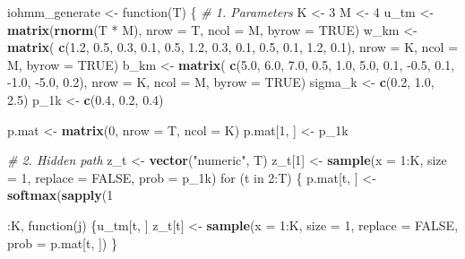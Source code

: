\documentclass[]{article}
\newenvironment{Shaded}{\begin{snugshade}}{\end{snugshade}}
\newcommand{\KeywordTok}[1]{\textcolor[rgb]{0.13,0.29,0.53}{\textbf{{#1}}}}
\newcommand{\DataTypeTok}[1]{\textcolor[rgb]{0.13,0.29,0.53}{{#1}}}
\newcommand{\DecValTok}[1]{\textcolor[rgb]{0.00,0.00,0.81}{{#1}}}
\newcommand{\FloatTok}[1]{\textcolor[rgb]{0.00,0.00,0.81}{{#1}}}
\newcommand{\StringTok}[1]{\textcolor[rgb]{0.31,0.60,0.02}{{#1}}}
\newcommand{\CommentTok}[1]{\textcolor[rgb]{0.56,0.35,0.01}{\textit{{#1}}}}
\newcommand{\OtherTok}[1]{\textcolor[rgb]{0.56,0.35,0.01}{{#1}}}
\newcommand{\NormalTok}[1]{{#1}}
\begin{document}
\begin{Shaded}
\begin{Highlighting}[]
\NormalTok{iohmm_generate <-}\StringTok{ }\NormalTok{function(T) \{}
  \CommentTok{# 1. Parameters}
  \NormalTok{K <-}\StringTok{ }\DecValTok{3}
  \NormalTok{M <-}\StringTok{ }\DecValTok{4}
  \NormalTok{u_tm <-}\StringTok{ }\KeywordTok{matrix}\NormalTok{(}\KeywordTok{rnorm}\NormalTok{(T *}\StringTok{ }\NormalTok{M), }\DataTypeTok{nrow =} \NormalTok{T, }\DataTypeTok{ncol =} \NormalTok{M, }\DataTypeTok{byrow =} \OtherTok{TRUE}\NormalTok{)}
  \NormalTok{w_km <-}\StringTok{ }\KeywordTok{matrix}\NormalTok{(}
    \KeywordTok{c}\NormalTok{(}\FloatTok{1.2}\NormalTok{, }\FloatTok{0.5}\NormalTok{, }\FloatTok{0.3}\NormalTok{, }\FloatTok{0.1}\NormalTok{, }\FloatTok{0.5}\NormalTok{, }\FloatTok{1.2}\NormalTok{, }\FloatTok{0.3}\NormalTok{, }\FloatTok{0.1}\NormalTok{, }\FloatTok{0.5}\NormalTok{, }\FloatTok{0.1}\NormalTok{, }\FloatTok{1.2}\NormalTok{, }\FloatTok{0.1}\NormalTok{),}
    \DataTypeTok{nrow =} \NormalTok{K, }\DataTypeTok{ncol =} \NormalTok{M, }\DataTypeTok{byrow =} \OtherTok{TRUE}\NormalTok{)}
  \NormalTok{b_km <-}\StringTok{ }\KeywordTok{matrix}\NormalTok{(}
    \KeywordTok{c}\NormalTok{(}\FloatTok{5.0}\NormalTok{, }\FloatTok{6.0}\NormalTok{, }\FloatTok{7.0}\NormalTok{, }\FloatTok{0.5}\NormalTok{, }\FloatTok{1.0}\NormalTok{, }\FloatTok{5.0}\NormalTok{, }\FloatTok{0.1}\NormalTok{, -}\FloatTok{0.5}\NormalTok{, }\FloatTok{0.1}\NormalTok{, -}\FloatTok{1.0}\NormalTok{, -}\FloatTok{5.0}\NormalTok{, }\FloatTok{0.2}\NormalTok{),}
    \DataTypeTok{nrow =} \NormalTok{K, }\DataTypeTok{ncol =} \NormalTok{M, }\DataTypeTok{byrow =} \OtherTok{TRUE}\NormalTok{)}
  \NormalTok{sigma_k <-}\StringTok{ }\KeywordTok{c}\NormalTok{(}\FloatTok{0.2}\NormalTok{, }\FloatTok{1.0}\NormalTok{, }\FloatTok{2.5}\NormalTok{)}
  \NormalTok{p_1k <-}\StringTok{ }\KeywordTok{c}\NormalTok{(}\FloatTok{0.4}\NormalTok{, }\FloatTok{0.2}\NormalTok{, }\FloatTok{0.4}\NormalTok{)}
  
  \NormalTok{p.mat <-}\StringTok{ }\KeywordTok{matrix}\NormalTok{(}\DecValTok{0}\NormalTok{, }\DataTypeTok{nrow =} \NormalTok{T, }\DataTypeTok{ncol =} \NormalTok{K)}
  \NormalTok{p.mat[}\DecValTok{1}\NormalTok{, ] <-}\StringTok{ }\NormalTok{p_1k}

  \CommentTok{# 2. Hidden path}
  \NormalTok{z_t <-}\StringTok{ }\KeywordTok{vector}\NormalTok{(}\StringTok{"numeric"}\NormalTok{, T)}
  \NormalTok{z_t[}\DecValTok{1}\NormalTok{] <-}\StringTok{ }\KeywordTok{sample}\NormalTok{(}\DataTypeTok{x =} \DecValTok{1}\NormalTok{:K, }\DataTypeTok{size =} \DecValTok{1}\NormalTok{, }\DataTypeTok{replace =} \OtherTok{FALSE}\NormalTok{, }\DataTypeTok{prob =} \NormalTok{p_1k)}
  \NormalTok{for (t in }\DecValTok{2}\NormalTok{:T) \{}
    \NormalTok{p.mat[t, ] <-}\StringTok{ }\KeywordTok{softmax}\NormalTok{(}\KeywordTok{sapply}\NormalTok{(}\DecValTok{1}\NormalTok{:K, function(j) \{u_tm[t, ] %
    \NormalTok{z_t[t] <-}\StringTok{ }\KeywordTok{sample}\NormalTok{(}\DataTypeTok{x =} \DecValTok{1}\NormalTok{:K, }\DataTypeTok{size =} \DecValTok{1}\NormalTok{, }\DataTypeTok{replace =} \OtherTok{FALSE}\NormalTok{, }\DataTypeTok{prob =} \NormalTok{p.mat[t, ])}
  \NormalTok{\}}

}
\end{Highlighting}
\end{Shaded}
\end{document}
